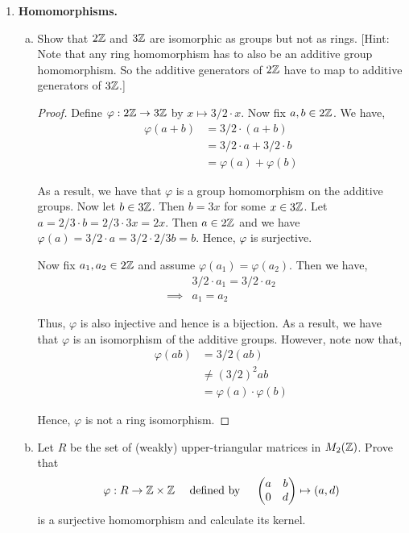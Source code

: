 \documentclass[11pt, reqno]{amsart}
\theoremstyle{plain}
\theoremstyle{definition}
\theoremstyle{example}
\begin{document}
\begin{enumerate}[1.]
\item {\bf Homomorphisms.}
\begin{enumerate}[(a)]
\item Show that $2\mathbb{Z}$ and $3\mathbb{Z}$ are isomorphic as groups but not as rings. {[Hint: Note that any ring homomorphism has to also be an additive group homomorphism. So the additive generators of $2\mathbb{Z}$ have to map to additive generators of $3\mathbb{Z}$.]}

\begin{proof}
Define $\varphi: 2\mathbb{Z} \to 3\mathbb{Z}$ by $x \mapsto 3/2 \cdot x$. Now fix $a, b \in 2\mathbb{Z}$. We have,
\begin{align*}
\varphi(a + b) &= 3/2 \cdot (a + b)\\
&= 3/2 \cdot a + 3/2 \cdot b\\
&= \varphi(a) + \varphi(b)
\end{align*}

As a result, we have that $\varphi$ is a group homomorphism on the additive groups. Now let $b \in 3\mathbb{Z}$. Then $b = 3x$ for some $x \in 3\mathbb{Z}$. Let $a = 2/3 \cdot b = 2/3 \cdot 3x = 2x$. Then $a \in 2\mathbb{Z}$ and we have $\varphi(a) = 3/2 \cdot a = 3/2 \cdot 2/3 b = b$. Hence, $\varphi$ is surjective.

\par
Now fix $a_1, a_2 \in 2\mathbb{Z}$ and assume $\varphi(a_1) = \varphi(a_2)$. Then we have,
\begin{align*}
&3/2 \cdot a_1 = 3/2 \cdot a_2\\
\implies &a_1 = a_2
\end{align*}

Thus, $\varphi$ is also injective and hence is a bijection. As a result, we have that $\varphi$ is an isomorphism of the additive groups. However, note now that,
\begin{align*}
\varphi(ab) &= 3/2(ab)\\
&\neq (3/2)^2 ab\\
&= \varphi(a) \cdot \varphi(b)
\end{align*}

Hence, $\varphi$ is not a ring isomorphism.
\end{proof}

\item Let $R$ be the set of (weakly) upper-triangular matrices in $M_2(\mathbb{Z})$. Prove that 
$$\varphi: R \to \mathbb{Z} \times \mathbb{Z} \quad \text{ defined by } \quad \begin{pmatrix} a & b \\ 0 & d \end{pmatrix} \mapsto (a,d)$$
is a surjective homomorphism and calculate its kernel. 


\end{enumerate}
\end{enumerate}
\end{document}
